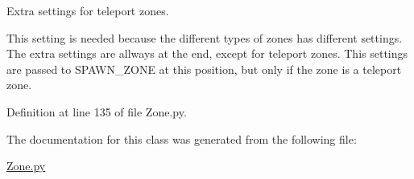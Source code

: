 Extra settings for teleport zones. 

This setting is needed because the different types of zones has different settings. The extra settings are allways at the end, except for teleport zones. This settings are passed to SPAWN\_\-ZONE at this position, but only if the zone is a teleport zone. 

Definition at line 135 of file Zone.py.



The documentation for this class was generated from the following file:\begin{DoxyCompactItemize}
\item 
\hyperlink{_zone_8py}{Zone.py}\end{DoxyCompactItemize}
